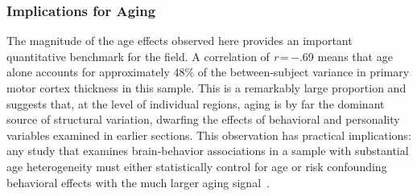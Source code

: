 \subsubsection{Implications for Aging}

The magnitude of the age effects observed here provides an important quantitative benchmark for the field.
A correlation of \textit{r}\,=\,$-$.69 means that age alone accounts for approximately 48\% of the between-subject variance in primary motor cortex thickness in this sample.
This is a remarkably large proportion and suggests that, at the level of individual regions, aging is by far the dominant source of structural variation, dwarfing the effects of behavioral and personality variables examined in earlier sections.
This observation has practical implications: any study that examines brain-behavior associations in a sample with substantial age heterogeneity must either statistically control for age or risk confounding behavioral effects with the much larger aging signal~\cite{fjell2010structural, raz2005regional}.
